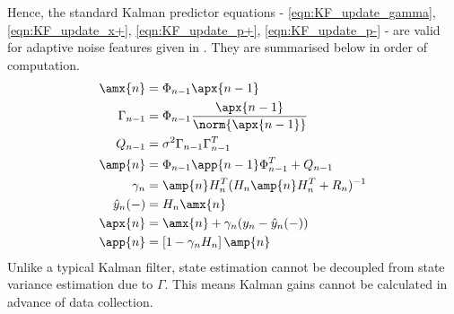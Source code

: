 Hence, the standard Kalman predictor equations - \ref{eqn:KF_update_gamma}, \ref{eqn:KF_update_x+}, \ref{eqn:KF_update_p+}, \ref{eqn:KF_update_p-} - are valid for adaptive noise features given in \cite{liska}. They are summarised below in order of computation. 
\begin{align}
\amx{n} & = \Phi_{n-1} \apx{n-1} \\
\Gamma_{n-1} &=\Phi_{n-1}\frac{\apx{n-1}}{\norm{\apx{n-1}}} \\
Q_{n-1} & = \sigma^2 \Gamma_{n-1}\Gamma_{n-1}^T \\
\amp{n}&= \Phi_{n-1} \app{n-1} \Phi_{n-1}^T + Q_{n-1} \\
\gamma_n &= \amp{n} H_n^T(H_n\amp{n}H_n^T + R_n)^{-1} \\
\hat{y}_n(-) & = H_n \amx{n} \\
\apx{n} &= \amx{n} + \gamma_n (y_n - \hat{y}_n(-)) \\
\app{n} &= \left[1  - \gamma_n H_n \right] \amp{n}
\end{align}
Unlike a typical Kalman filter, state estimation cannot be decoupled from state variance estimation due to $\Gamma$. This means Kalman gains cannot be calculated in advance of data collection.

\newpage

